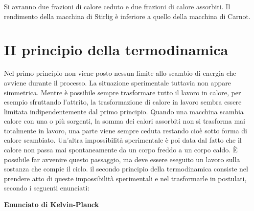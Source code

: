 Si avranno due frazioni di calore ceduto e due frazioni di calore assorbiti. Il rendimento della macchina di Stirlig è inferiore a quello della macchina di Carnot.

\section{II principio della termodinamica}

Nel primo principio non viene posto nessun limite allo scambio di energia che avviene durante il processo. La situazione sperimentale tuttavia non appare simmetrica. Mentre è possibile sempre trasformare tutto il lavoro in calore, per esempio sfruttando l'attrito, la trasformazione di calore in lavoro sembra essere limitata indipendentemente dal primo principio. Quando una macchina scambia calore con una o più sorgenti, la somma dei calori assorbiti non si trasforma mai totalmente in lavoro, una parte viene sempre ceduta restando cioè sotto forma di calore scambiato. Un'altra impossibilità sperimentale è poi data dal fatto che il calore non passa mai spontaneamente da un corpo freddo a un corpo caldo. È possibile far avvenire questo passaggio, ma deve essere eseguito un lavoro sulla sostanza che compie il ciclo.
il secondo principio della termodinamica consiste nel prendere atto di queste impossibilità sperimentali e nel trasformarle in postulati, secondo i seguenti enunciati:

\textbf{Enunciato di Kelvin-Planck}

\noindent{}

